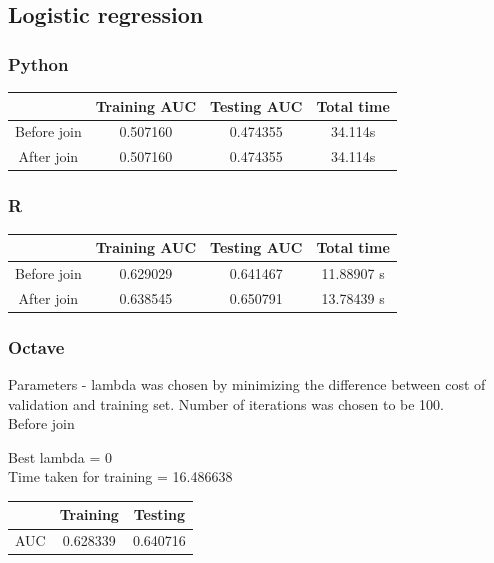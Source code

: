 \documentclass[10pt]{article}
\begin{document}
\subsection{Logistic regression}
\subsubsection{Python}

\begin{center}
 \begin{tabular}{|c | c | c | c||} 
 \hline
 & Training AUC & Testing AUC & Total time\\ [0.5ex]
 \hline\hline
Before join & 0.507160 & 0.474355 & 34.114s\\
 \hline
After join & 0.507160 & 0.474355 & 34.114s\\ 
 \hline
\end{tabular}
\end{center}

\subsubsection{R}

\begin{center}
 \begin{tabular}{|c | c | c | c||} 
 \hline
 & Training AUC & Testing AUC & Total time\\ [0.5ex]
 \hline\hline
Before join & 0.629029 & 0.641467 & 11.88907 s\\
 \hline
After join & 0.638545 & 0.650791 & 13.78439 s\\ 
 \hline
\end{tabular}
\end{center}

\subsubsection{Octave}
Parameters - lambda was chosen by minimizing the difference between cost of validation and training set. Number of iterations was chosen to be 100.
\\

Before join

	Best lambda = 0 
\\

	Time taken for training = 16.486638

\begin{center}
 \begin{tabular}{|c | c | c ||} 
 \hline
 & Training & Testing\\ [0.5ex] 
 \hline\hline
AUC & 0.628339 & 0.640716\\
 \hline
\end{tabular}
\end{center}
\end{document}
